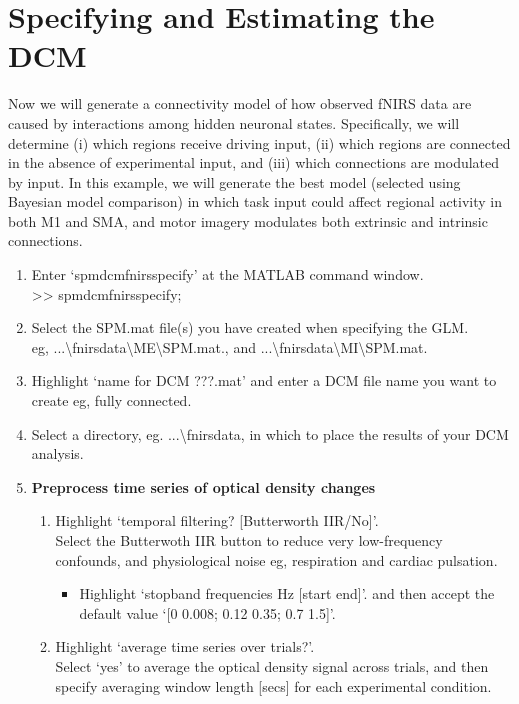 \section{Specifying and Estimating the DCM}
Now we will generate a connectivity model of how observed fNIRS data are caused by interactions among hidden neuronal states. Specifically, we will determine (i) which regions receive driving input, (ii) which regions are connected in the absence of experimental input, and (iii) which connections are modulated by input. In this example, we will generate the best model (selected using Bayesian model comparison) in which task input could affect regional activity in both M1 and SMA, and motor imagery modulates both extrinsic and intrinsic connections. 

\begin{enumerate} 
\item Enter `spm\textunderscore dcm\textunderscore fnirs\textunderscore specify' at the MATLAB command window. \\
>> spm\textunderscore dcm\textunderscore fnirs\textunderscore specify;
\item Select the SPM.mat file(s) you have created when specifying the GLM. \\
eg, ...\textbackslash fnirs\textunderscore data\textbackslash ME\textbackslash SPM.mat., and ...\textbackslash fnirs\textunderscore data\textbackslash MI\textbackslash SPM.mat.
\item Highlight `name for DCM \textunderscore???.mat' and enter a DCM file name you want to create eg, fully connected.
\item Select a directory, eg. ...\textbackslash fnirs\textunderscore data, in which to place the results of your DCM analysis.
\item \textbf{Preprocess time series of optical density changes}
\begin{enumerate} 
\item Highlight `temporal filtering? [Butterworth IIR/No]'. \\Select the Butterwoth IIR button to reduce very low-frequency confounds, and physiological noise eg, respiration and cardiac pulsation.
\begin{itemize}
\item Highlight `stopband frequencies Hz [start end]'. and then accept the default value `[0 0.008; 0.12 0.35; 0.7 1.5]'.
\end{itemize}
\item Highlight `average time series over trials?'. \\Select `yes' to average the optical density signal across trials, and then specify averaging window length [secs] for each experimental condition. 

\end{enumerate}
\end{enumerate}
